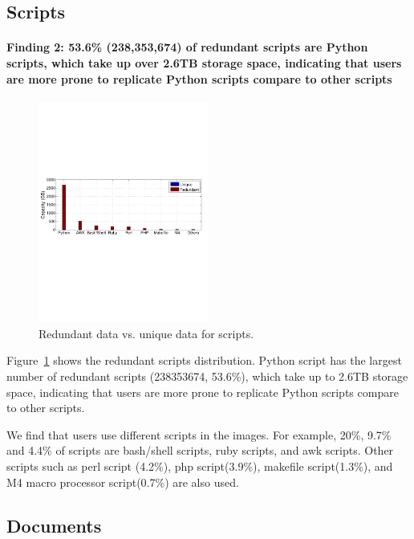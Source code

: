 \subsection{Scripts}
\paragraph{Finding 2: 53.6\% (238,353,674) of redundant scripts are Python scripts, which take up over 2.6TB storage space, indicating that users are more prone to replicate Python scripts compare to other scripts}

\begin{figure}
	\centering
	\includegraphics[width=0.5\textwidth]{graphs/type-script-cap}
	\caption{Redundant data vs. unique data for scripts.
	}
	\label{fig:type-script}
\end{figure}

Figure~\ref{fig:type-script} shows the redundant scripts distribution. Python script has the largest number of redundant scripts (238353674, 53.6\%), which take up to 2.6TB storage space, indicating that users are more prone to replicate Python scripts compare to other scripts. 

We find that users use different scripts in the images. 
For example, 20\%, 9.7\% and 4.4\% of scripts are bash/shell scripts, ruby scripts, and awk scripts. Other scripts such as perl script (4.2\%), php script(3.9\%), makefile script(1.3\%), and M4 macro processor script(0.7\%) are also used.

\subsection{Documents}
